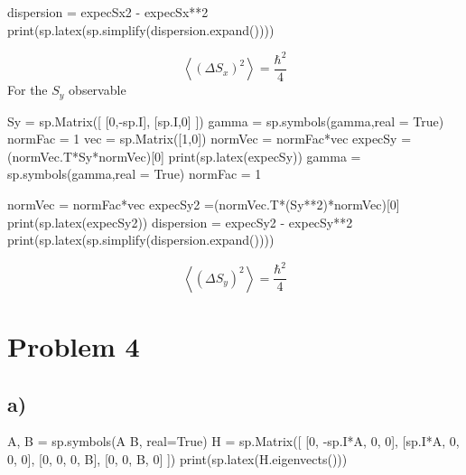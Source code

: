 \documentclass[]{article}
\newenvironment{Shaded}{\begin{snugshade}}{\end{snugshade}}
\newcommand{\NormalTok}[1]{#1}
\begin{document}
\begin{Shaded}
\begin{Highlighting}[]
\NormalTok{dispersion = expecSx2 {-} expecSx**2}
\NormalTok{print(sp.latex(sp.simplify(dispersion.expand())))}
\end{Highlighting}
\end{Shaded}

\[
\left<\left( \Delta S_{x} \right) ^{2}\right>  = \frac{\hbar^{2}}{4}
\] For the \(S_{y}\) observable

\begin{Shaded}
\begin{Highlighting}[]
\NormalTok{Sy = sp.Matrix([}
\NormalTok{[0,{-}sp.I],}
\NormalTok{[sp.I,0]}
\NormalTok{])}
\NormalTok{gamma = sp.symbols(\textquotesingle{}gamma\textquotesingle{},real = True)}
\NormalTok{normFac = 1}
\NormalTok{vec = sp.Matrix([1,0])}
\NormalTok{normVec = normFac*vec}
\NormalTok{expecSy = (normVec.T*Sy*normVec)[0]}
\NormalTok{print(sp.latex(expecSy))}
\NormalTok{gamma = sp.symbols(\textquotesingle{}gamma\textquotesingle{},real = True)}
\NormalTok{normFac = 1}

\NormalTok{normVec = normFac*vec}
\NormalTok{expecSy2 =(normVec.T*(Sy**2)*normVec)[0]}
\NormalTok{print(sp.latex(expecSy2))}
\NormalTok{dispersion = expecSy2 {-} expecSy**2}
\NormalTok{print(sp.latex(sp.simplify(dispersion.expand())))}
\end{Highlighting}
\end{Shaded}

\[
\left<\left( \Delta S_{y} \right) ^{2}\right>  = \frac{\hbar^{2}}{4}
\]

\hypertarget{problem-4}{%
\section{Problem 4}\label{problem-4}}

\hypertarget{a-2}{%
\subsection{a)}\label{a-2}}

\begin{Shaded}
\begin{Highlighting}[]
\NormalTok{A, B = sp.symbols(\textquotesingle{}A B\textquotesingle{}, real=True)}
\NormalTok{H = sp.Matrix([ }
\NormalTok{[0, {-}sp.I*A, 0, 0], }
\NormalTok{[sp.I*A, 0, 0, 0],}
\NormalTok{[0, 0, 0, B], }
\NormalTok{[0, 0, B, 0] }
\NormalTok{])}
\NormalTok{print(sp.latex(H.eigenvects()))}
\end{Highlighting}
\end{Shaded}
\end{document}
